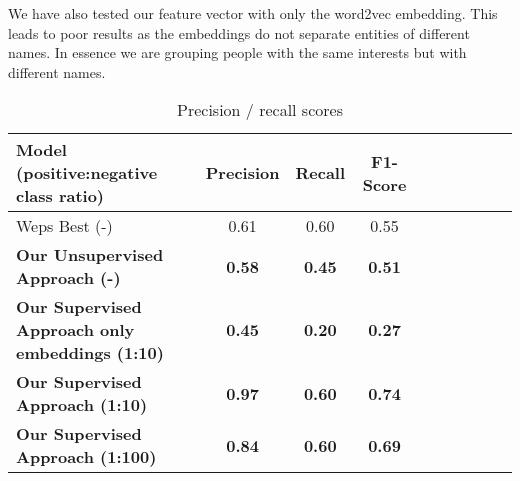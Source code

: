 We have also tested our feature vector with only the word2vec embedding. This leads to
poor results as the embeddings do not separate entities of different names. In essence
we are grouping people with the same interests but with different names.

\begin{center}
\begin{table}[htb]
  \caption{Precision / recall scores}
  \begin{tabular}{l*{8}{c}r}
    \textbf {Model (positive:negative class ratio)} & \textbf{Precision} & \textbf{Recall} & \textbf{F1-Score} \\
    \hline
    Weps Best (-) \cite{weps3-eval} & 0.61 & 0.60 & 0.55 \\
    \textbf{Our Unsupervised Approach (-)} & \textbf{ 0.58 } & \textbf {0.45}  & \textbf{0.51} \\
    \textbf{Our Supervised Approach only embeddings (1:10)} & \textbf{ 0.45 } & \textbf{0.20} & \textbf{0.27} \\
    \textbf{Our Supervised Approach (1:10)} & \textbf { 0.97 } & \textbf {0.60} & \textbf{0.74} \\
    \textbf{Our Supervised Approach (1:100)} & \textbf{ 0.84 } & \textbf {0.60}  & \textbf{0.69} \\
  \end{tabular}
  \label{table:results}
\end{table}
\end{center}


